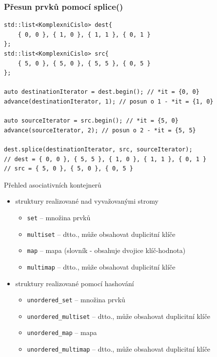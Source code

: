 \begin{frame}[fragile]
\frametitle{Přesun prvků pomocí splice()}
\begin{yesblock}
\begin{lstlisting}
std::list<KomplexniCislo> dest{
	{ 0, 0 }, { 1, 0 }, { 1, 1 }, { 0, 1 }
};
std::list<KomplexniCislo> src{
	{ 5, 0 }, { 5, 0 }, { 5, 5 }, { 0, 5 }
};

auto destinationIterator = dest.begin(); // *it = {0, 0}
advance(destinationIterator, 1); // posun o 1 - *it = {1, 0}

auto sourceIterator = src.begin(); // *it = {5, 0}
advance(sourceIterator, 2); // posun o 2 - *it = {5, 5}

dest.splice(destinationIterator, src, sourceIterator);
// dest = { 0, 0 }, { 5, 5 }, { 1, 0 }, { 1, 1 }, { 0, 1 }
// src = { 5, 0 }, { 5, 0 }, { 0, 5 }
\end{lstlisting}
\end{yesblock}
\end{frame}














\begin{frame}[fragile]
\begin{block}{Přehled asociativních kontejnerů}
\begin{itemize}
\item struktury realizované nad vyvažovanými stromy
\begin{itemize}
\item \lstinline|set| -- množina prvků
\item \lstinline|multiset| -- dtto., může obsahovat duplicitní klíče
\item \lstinline|map| -- mapa (slovník - obsahuje dvojice klíč-hodnota)
\item \lstinline|multimap| -- dtto., může obsahovat duplicitní klíče
\end{itemize}
\item struktury realizované pomocí hashování
\begin{itemize}
\item \lstinline|unordered_set| -- množina prvků
\item \lstinline|unordered_multiset| -- dtto., může obsahovat duplicitní klíče
\item \lstinline|unordered_map| -- mapa
\item \lstinline|unordered_multimap| -- dtto., může obsahovat duplicitní klíče
\end{itemize}
\end{itemize}
\end{block}
\end{frame}





